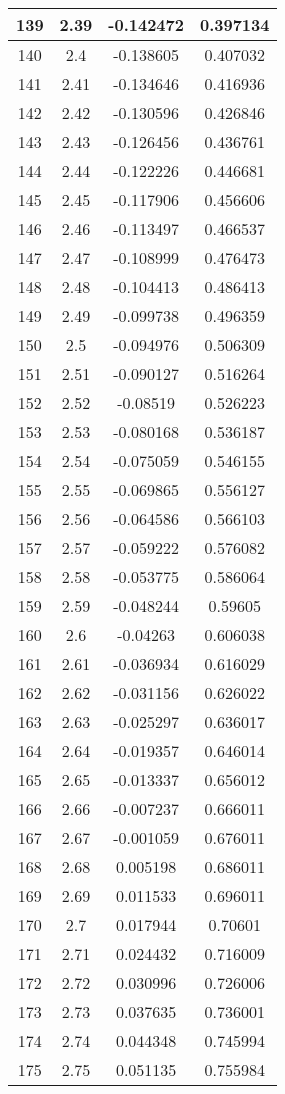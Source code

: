 \begin{center}
\begin{tabular}{|c|c|c|c|}
		\hline
		139 & 2.39 & -0.142472 & 0.397134 \\
		\hline
		140 & 2.4 & -0.138605 & 0.407032 \\
		\hline
		141 & 2.41 & -0.134646 & 0.416936 \\
		\hline
		142 & 2.42 & -0.130596 & 0.426846 \\
		\hline
		143 & 2.43 & -0.126456 & 0.436761 \\
		\hline
		144 & 2.44 & -0.122226 & 0.446681 \\
		\hline
		145 & 2.45 & -0.117906 & 0.456606 \\
		\hline
		146 & 2.46 & -0.113497 & 0.466537 \\
		\hline
		147 & 2.47 & -0.108999 & 0.476473 \\
		\hline
		148 & 2.48 & -0.104413 & 0.486413 \\
		\hline
		149 & 2.49 & -0.099738 & 0.496359 \\
		\hline
		150 & 2.5 & -0.094976 & 0.506309 \\
		\hline
		151 & 2.51 & -0.090127 & 0.516264 \\
		\hline
		152 & 2.52 & -0.08519 & 0.526223 \\
		\hline
		153 & 2.53 & -0.080168 & 0.536187 \\
		\hline
		154 & 2.54 & -0.075059 & 0.546155 \\
		\hline
		155 & 2.55 & -0.069865 & 0.556127 \\
		\hline
		156 & 2.56 & -0.064586 & 0.566103 \\
		\hline
		157 & 2.57 & -0.059222 & 0.576082 \\
		\hline
		158 & 2.58 & -0.053775 & 0.586064 \\
		\hline
		159 & 2.59 & -0.048244 & 0.59605 \\
		\hline
		160 & 2.6 & -0.04263 & 0.606038 \\
		\hline
		161 & 2.61 & -0.036934 & 0.616029 \\
		\hline
		162 & 2.62 & -0.031156 & 0.626022 \\
		\hline
		163 & 2.63 & -0.025297 & 0.636017 \\
		\hline
		164 & 2.64 & -0.019357 & 0.646014 \\
		\hline
		165 & 2.65 & -0.013337 & 0.656012 \\
		\hline
		166 & 2.66 & -0.007237 & 0.666011 \\
		\hline
		167 & 2.67 & -0.001059 & 0.676011 \\
		\hline
		168 & 2.68 & 0.005198 & 0.686011 \\
		\hline
		169 & 2.69 & 0.011533 & 0.696011 \\
		\hline
		170 & 2.7 & 0.017944 & 0.70601 \\
		\hline
		171 & 2.71 & 0.024432 & 0.716009 \\
		\hline
		172 & 2.72 & 0.030996 & 0.726006 \\
		\hline
		173 & 2.73 & 0.037635 & 0.736001 \\
		\hline
		174 & 2.74 & 0.044348 & 0.745994 \\
		\hline
		175 & 2.75 & 0.051135 & 0.755984 \\
		\hline
\end{tabular}


\end{center}
